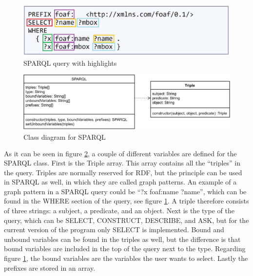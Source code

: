 \begin{figure}[H]
    \centering
    \includegraphics[width=1\textwidth]{figures/sparql-example.pdf}
    \caption{SPARQL query with highlights}
    \label{fig:sparql-example}
\end{figure}

\begin{figure}[H]
    \centering
    \includegraphics[width=1\textwidth]{figures/SPARQL-Triple-class.pdf}
    \caption{Class diagram for SPARQL}
    \label{fig:SPARQL-Triple-class}
\end{figure}

As it can be seen in figure \ref{fig:SPARQL-Triple-class}, a couple of different variables are defined for the SPARQL class. First is the Triple array. This array contains all the “triples” in the query. Triples are normally reserved for RDF, but the principle can be used in SPARQL as well, in which they are called graph patterns. An example of a graph pattern in a SPARQL query could be “?x foaf:name ?name”, which can be found in the WHERE section of the query, see figure \ref{fig:sparql-example}. A triple therefore consists of three strings: a subject, a predicate, and an object. Next is the type of the query, which can be SELECT, CONSTRUCT, DESCRIBE, and ASK, but for the current version of the program only SELECT is implemented. Bound and unbound variables can be found in the triples as well, but the difference is that bound variables are included in the top of the query next to the type. Regarding figure \ref{fig:sparql-example}, the bound variables are the variables the user wants to select. Lastly the prefixes are stored in an array.

